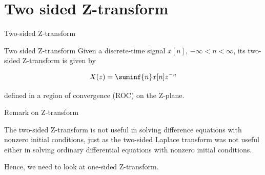 \documentclass[aspectratio=169,xcolor=dvipsnames,svgnames,x11names,fleqn]{beamer}
\begin{document}
\begin{frame}{}
\vspace*{-9\baselineskip}
    \color{LightGray}{Blank space for calculation}
\end{frame}
\begin{frame}{}
\vspace*{-9\baselineskip}
    \color{LightGray}{Blank space for calculation}
\end{frame}
\begin{frame}{}
\vspace*{-9\baselineskip}
    \color{LightGray}{Blank space for calculation}
\end{frame}
\section{Two sided Z-transform}


\begin{frame}{}
    \begin{center}
    \Huge \bf \color{DarkBlue}
    \faCaretRight\faCaretLeft
    
    Two-sided Z-transform
\end{center}
\end{frame}

\begin{frame}{Two sided Z-transform}
    Given a discrete-time signal $x[n]$, $ -\infty <n< \infty$, its two-sided Z-transform is given by

    $$
    X(z) = \suminf{n} x[n]z^{-n}
    $$

    defined in a region of convergence (ROC) on the Z-plane.
    
\end{frame}

\begin{frame}{Remark on Z-transform}

    \begin{gradred}
        The two-sided Z-transform is not useful in solving difference equations with nonzero initial conditions, just as the two-sided Laplace transform was not useful either in solving ordinary differential equations with nonzero initial conditions.
    \end{gradred}

    Hence, we need to look at one-sided Z-transform.


\end{frame}
\end{document}
